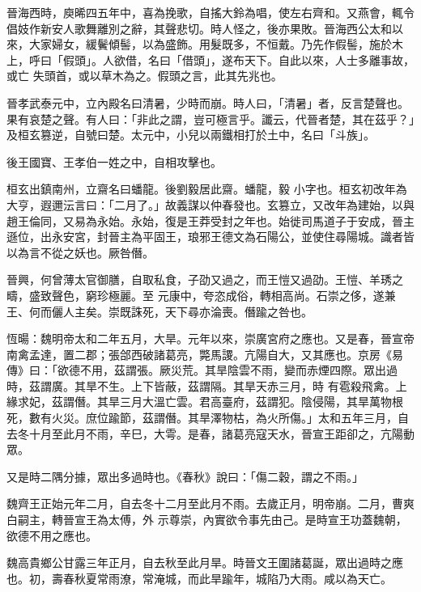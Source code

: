 \begin{pinyinscope}
 晉海西時，庾晞四五年中，喜為挽歌，自搖大鈴為唱，使左右齊和。又燕會，輒令倡妓作新安人歌舞離別之辭，其聲悲切。時人怪之，後亦果敗。晉海西公太和以來，大家婦女，緩鬢傾髻，以為盛飾。用髮既多，不恒戴。乃先作假髻，施於木上，呼曰「假頭」。人欲借，名曰「借頭」，遂布天下。自此以來，人士多離事故，或亡
 失頭首，或以草木為之。假頭之言，此其先兆也。



 晉孝武泰元中，立內殿名曰清暑，少時而崩。時人曰，「清暑」者，反言楚聲也。果有哀楚之聲。有人曰：「非此之謂，豈可極言乎。讖云，代晉者楚，其在茲乎？」及桓玄篡逆，自號曰楚。太元中，小兒以兩鐵相打於土中，名曰「斗族」。



 後王國寶、王孝伯一姓之中，自相攻擊也。



 桓玄出鎮南州，立齋名曰蟠龍。後劉毅居此齋。蟠龍，毅
 小字也。桓玄初改年為大亨，遐邇沄言曰：「二月了。」故義謀以仲春發也。玄篡立，又改年為建始，以與趙王倫同，又易為永始。永始，復是王莽受封之年也。始徙司馬道子于安成，晉主遜位，出永安宮，封晉主為平固王，琅邪王德文為石陽公，並使住尋陽城。識者皆以為言不從之妖也。厥咎僭。



 晉興，何曾薄太官御膳，自取私食，子劭又過之，而王愷又過劭。王愷、羊琇之疇，盛致聲色，窮珍極麗。至
 元康中，夸恣成俗，轉相高尚。石崇之侈，遂兼王、何而儷人主矣。崇既誅死，天下尋亦淪喪。僭踰之咎也。



 恆暘：魏明帝太和二年五月，大旱。元年以來，崇廣宮府之應也。又是春，晉宣帝南禽孟達，置二郡；張郃西破諸葛亮，斃馬謖。亢陽自大，又其應也。京房《易傳》曰：「欲德不用，茲謂張。厥災荒。其旱陰雲不雨，變而赤煙四際。眾出過時，茲謂廣。其旱不生。上下皆蔽，茲謂隔。其旱天赤三月，時
 有雹殺飛禽。上緣求妃，茲謂僭。其旱三月大溫亡雲。君高臺府，茲謂犯。陰侵陽，其旱萬物根死，數有火災。庶位踰節，茲謂僭。其旱澤物枯，為火所傷。」太和五年三月，自去冬十月至此月不雨，辛巳，大雩。是春，諸葛亮寇天水，晉宣王距卻之，亢陽動眾。



 又是時二隅分據，眾出多過時也。《春秋》說曰：「傷二穀，謂之不雨。」



 魏齊王正始元年二月，自去冬十二月至此月不雨。去歲正月，明帝崩。二月，曹爽白嗣主，轉晉宣王為太傅，外
 示尊崇，內實欲令事先由己。是時宣王功蓋魏朝，欲德不用之應也。



 魏高貴鄉公甘露三年正月，自去秋至此月旱。時晉文王圍諸葛誕，眾出過時之應也。初，壽春秋夏常雨潦，常淹城，而此旱踰年，城陷乃大雨。咸以為天亡。




\end{pinyinscope}
